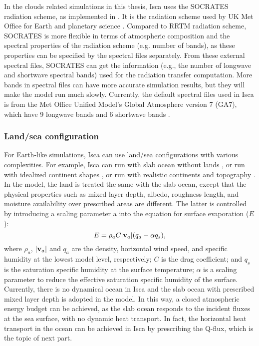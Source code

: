 In the clouds related simulations in this thesis, Isca uses the SOCRATES radiation scheme, as implemented in \cite{Thomson2019}. It is the radiation scheme used by UK Met Office for Earth and planetary science \citep{Manners2015}. Compared to RRTM radiation scheme, SOCRATES is more flexible in terms of atmospheric composition and the spectral properties of the radiation scheme (e.g. number of bands), as these properties can be specified by the spectral files separately. From these external spectral files, SOCRATES can get the information (e.g., the number of longwave and shortwave spectral bands) used for the radiation transfer computation. More bands in spectral files can have more accurate simulation results, but they will make the model run much slowly. Currently, the default spectral files used in Isca is from the Met Office Unified Model's Global Atmosphere version 7 (GA7), which have 9 longwave bands and 6 shortwave bands \citep{Walters2019}.

\subsubsection{Land/sea configuration}
For Earth-like simulations, Isca can use land/sea configurations with various complexities. For example, Isca can run with slab ocean without lands \citep[aquaplanet setup; e.g.,][]{Geen2018regime,Geen2019processes}, or run with idealized continent shapes \citep[e.g.,][]{Pietschnig2019}, or run with realistic continents and topography \citep[e.g.,][]{Geen2018regime}. In the model, the land is treated the same with the slab ocean, except that the physical properties such as mixed layer depth, albedo, roughness length, and moisture availability over prescribed areas are different. The latter is controlled by introducing a scaling parameter a into the equation for surface evaporation ($E$):
\begin{equation}
    E = \rho_a C|\bold{v}_a|(q_a -\alpha q_s),
\end{equation}
where $\rho_a$, $|\bold{v}_a|$ and $q_a$ are the density, horizontal wind speed, and specific humidity at the lowest model level, respectively; $C$ is the drag coefficient; and $q_s$ is the saturation specific humidity at the surface temperature; $\alpha$ is a scaling parameter to reduce the effective saturation specific humidity of the surface. Currently, there is no dynamical ocean in Isca and the slab ocean with prescribed mixed layer depth is adopted in the model. In this way, a closed atmospheric energy budget can be achieved, as the slab ocean responds to the incident fluxes at the sea surface, with no dynamic heat transport. In fact, the horizontal heat transport in the ocean can be achieved in Isca by prescribing the Q-flux, which is the topic of next part.

